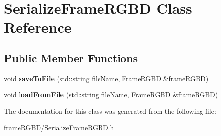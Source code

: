 \hypertarget{classSerializeFrameRGBD}{\section{\-Serialize\-Frame\-R\-G\-B\-D \-Class \-Reference}
\label{classSerializeFrameRGBD}
}
\subsection*{\-Public \-Member \-Functions}
\begin{DoxyCompactItemize}
\item 
\hypertarget{classSerializeFrameRGBD_ab69036e4a58a652a2a0e0a7696436059}{void {\bfseries save\-To\-File} (std\-::string file\-Name, \hyperlink{classFrameRGBD}{\-Frame\-R\-G\-B\-D} \&frame\-R\-G\-B\-D)}\label{classSerializeFrameRGBD_ab69036e4a58a652a2a0e0a7696436059}

\item 
\hypertarget{classSerializeFrameRGBD_abd067162c4f1fcfc6e4d17d593b21b90}{void {\bfseries load\-From\-File} (std\-::string file\-Name, \hyperlink{classFrameRGBD}{\-Frame\-R\-G\-B\-D} \&frame\-R\-G\-B\-D)}\label{classSerializeFrameRGBD_abd067162c4f1fcfc6e4d17d593b21b90}

\end{DoxyCompactItemize}


\-The documentation for this class was generated from the following file\-:\begin{DoxyCompactItemize}
\item 
frame\-R\-G\-B\-D/\-Serialize\-Frame\-R\-G\-B\-D.\-h\end{DoxyCompactItemize}
